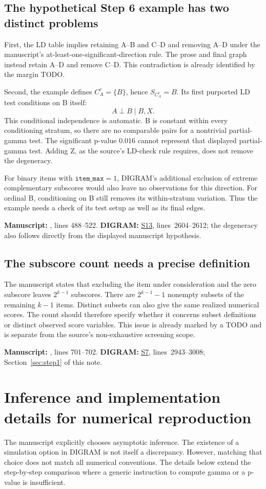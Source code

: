 \documentclass[11pt,a4paper]{article}
\newcommand{\ind}{\perp}
\newcommand{\src}[2]{\hyperlink{source-#1}{\textsf{#1}}, lines~#2}
\newcommand{\trace}[2]{%
  \par\smallskip
  {\footnotesize\color{tracegray}\textbf{Manuscript:} #1.\quad
  \textbf{DIGRAM:} #2.\par}\medskip}
\newcommand{\finding}[1]{\Needspace{5\baselineskip}\subsection{#1}}
\begin{document}
\finding{The hypothetical Step 6 example has two distinct problems}
First, the LD table implies retaining A--B and C--D and removing A--D under
the manuscript's at-least-one-significant-direction rule.
The prose and final graph instead retain A--D and remove C--D.
This contradiction is already identified by the margin TODO.

Second, the example defines \(C_A^c=\{B\}\), hence \(S_{C_A^c}=B\).
Its first purported LD test conditions on B itself:
\[
 A\ind B\mid B,X.
\]
This conditional independence is automatic. B is constant within every
conditioning stratum, so there are no comparable pairs for a nontrivial
partial-gamma test. The significant p-value \(0.016\) cannot represent
that displayed partial-gamma test. Adding Z, as the source's LD-check rule
requires, does not remove the degeneracy.

For binary items with \(\texttt{item\_max}=1\), DIGRAM's additional
exclusion of extreme complementary subscores would also leave no
observations for this direction.
For ordinal B, conditioning on B still removes its within-stratum variation.
Thus the example needs a check of its test setup as well as its final edges.
\trace{, lines 488--522}
{\src{S13}{2604--2612}; the degeneracy also follows directly from the
displayed manuscript hypothesis}

\finding{The subscore count needs a precise definition}
The manuscript states that excluding the item under consideration and the
zero subscore leaves \(2^{k-1}\) subscores.
There are \(2^{k-1}-1\) nonempty subsets of the remaining \(k-1\) items.
Distinct subsets can also give the same realized numerical scores.
The count should therefore specify whether it concerns subset definitions
or distinct observed score variables.
This issue is already marked by a TODO and is separate from the source's
non-exhaustive screening scope.
\trace{, lines 701--702}
{\src{S7}{2943--3008}; Section~\ref{sec:step1} of this note}

\section{Inference and implementation details for numerical reproduction}
\label{sec:inference}
The manuscript explicitly chooses asymptotic inference.
The existence of a simulation option in DIGRAM is not itself a discrepancy.
However, matching that choice does not match all numerical conventions.
The details below extend the step-by-step comparison where a generic
instruction to compute gamma or a p-value is insufficient.
\end{document}
